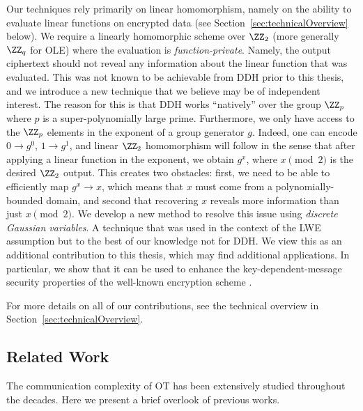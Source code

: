 Our techniques rely primarily on linear homomorphism, namely on the ability to evaluate linear functions on encrypted data (see Section~\ref{sec:technicalOverview} below). We require a linearly homomorphic scheme over $\ZZ_2$ (more generally $\ZZ_q$ for OLE) where the evaluation is \emph{function-private}. Namely, the output ciphertext should not reveal any information about the linear function that was evaluated. This was not known to be achievable from DDH prior to this thesis, and we introduce a new technique that we believe may be of independent interest. The reason for this is that DDH works ``natively'' over the group $\ZZ_p$ where $p$ is a super-polynomially large prime. Furthermore, we only have access to the $\ZZ_p$ elements in the exponent of a group generator $g$. Indeed, one can encode $0 \to g^0$, $1 \to g^1$, and linear $\ZZ_2$ homomorphism will follow in the sense that after applying a linear function in the exponent, we obtain $g^x$, where $x \pmod{2}$ is the desired $\ZZ_2$ output. This creates two obstacles: first, we need to be able to efficiently map $g^x \to x$, which means that $x$ must come from a polynomially-bounded domain, and second that recovering $x$ reveals more information than just $x \pmod{2}$. We develop a new method to resolve this issue using \emph{discrete Gaussian variables}. A technique that was used in the context of the LWE assumption but to the best of our knowledge not for DDH. We view this as an additional contribution to this thesis, which may find additional applications. In particular, we show that it can be used to enhance the key-dependent-message security properties of the well-known encryption scheme \cite{C:BHHO08}.

For more details on all of our contributions, see the technical overview in Section~\ref{sec:technicalOverview}.



\subsection{Related Work}

The communication complexity of OT has been extensively studied throughout the decades. Here we present a brief overlook of previous works.



